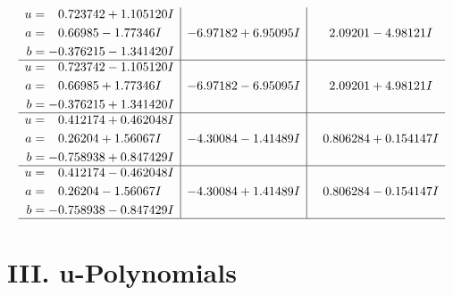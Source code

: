 \documentclass[1p]{elsarticle_modified}
\theoremstyle{definition}
\begin{document}
$$\begin{array}{c|c|c}
\begin{aligned}
u &= \phantom{-}0.723742 + 1.105120 I \\
a &= \phantom{-}0.66985 - 1.77346 I \\
b &= -0.376215 - 1.341420 I\end{aligned}
 & -6.97182 + 6.95095 I & \phantom{-}2.09201 - 4.98121 I \\ \hline\begin{aligned}
u &= \phantom{-}0.723742 - 1.105120 I \\
a &= \phantom{-}0.66985 + 1.77346 I \\
b &= -0.376215 + 1.341420 I\end{aligned}
 & -6.97182 - 6.95095 I & \phantom{-}2.09201 + 4.98121 I \\ \hline\begin{aligned}
u &= \phantom{-}0.412174 + 0.462048 I \\
a &= \phantom{-}0.26204 + 1.56067 I \\
b &= -0.758938 + 0.847429 I\end{aligned}
 & -4.30084 - 1.41489 I & \phantom{-}0.806284 + 0.154147 I \\ \hline\begin{aligned}
u &= \phantom{-}0.412174 - 0.462048 I \\
a &= \phantom{-}0.26204 - 1.56067 I \\
b &= -0.758938 - 0.847429 I\end{aligned}
 & -4.30084 + 1.41489 I & \phantom{-}0.806284 - 0.154147 I\\
 \hline 
 \end{array}$$\newpage
\newpage\renewcommand{\arraystretch}{1}
\centering \section*{ III. u-Polynomials}
\end{document}

